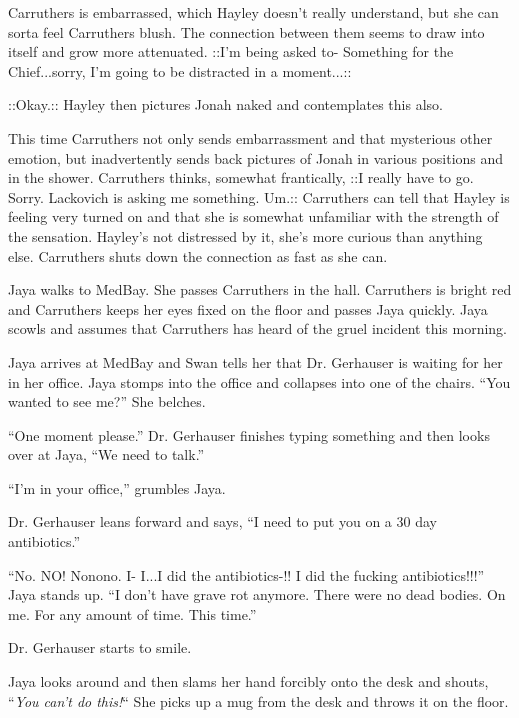 Carruthers is embarrassed, which Hayley doesn't really understand, but she can sorta feel Carruthers blush.  The connection between them seems to draw into itself and grow more attenuated.   {\color[RGB]{153,0,255}::I'm being asked to- Something for the Chief...sorry, I'm going to be distracted in a moment...::}  

 {\color[RGB]{255,153,0}::Okay.::}   Hayley then pictures Jonah naked and contemplates this also.

This time Carruthers not only sends embarrassment and that mysterious other emotion, but inadvertently sends back pictures of Jonah in various positions and in the shower.  Carruthers thinks, somewhat frantically,  {\color[RGB]{153,0,255}::I really have to go.  Sorry.  Lackovich is asking me something.  Um.::  } Carruthers can tell that Hayley is feeling very turned on and that she is somewhat unfamiliar with the strength of the sensation. Hayley's not distressed by it, she's more curious than anything else. Carruthers shuts down the connection as fast as she can.





Jaya walks to MedBay.  She passes Carruthers in the hall.  Carruthers is bright red and Carruthers keeps her eyes fixed on the floor and passes Jaya quickly.  Jaya scowls and assumes that Carruthers has heard of the gruel incident this morning.



Jaya arrives at MedBay and Swan tells her that Dr. Gerhauser is waiting for her in her office.  Jaya stomps into the office and collapses into one of the chairs. ``You wanted to see me?''  She belches.

``One moment please.''  Dr. Gerhauser finishes typing something and then looks over at Jaya, ``We need to talk.''

``I'm in your office,'' grumbles Jaya.

Dr. Gerhauser leans forward and says, ``I need to put you on a 30 day antibiotics.''

``No.  NO!  Nonono.  I- I...I did the antibiotics-!!  I did the fucking antibiotics!!!''  Jaya stands up. ``I don't have grave rot anymore.  There were no dead bodies. On me.  For any amount of time.  This time.''

Dr. Gerhauser starts to smile.

Jaya looks around and then slams her hand forcibly onto the desk and shouts, ``\textit{You can't do this!}``   She picks up a mug from the desk and throws it on the floor.

